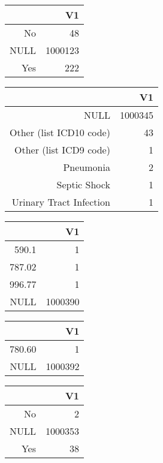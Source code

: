 \bigskip\bigskip
\centering
\begin{tabular}{rr}
  \hline
 & V1 \\ 
  \hline
No &  48 \\ 
  NULL & 1000123 \\ 
  Yes & 222 \\ 
   \hline
\end{tabular}

\bigskip\bigskip
\centering
\begin{tabular}{rr}
  \hline
 & V1 \\ 
  \hline
NULL & 1000345 \\ 
  Other (list ICD10 code) &  43 \\ 
  Other (list ICD9 code) &   1 \\ 
  Pneumonia &   2 \\ 
  Septic Shock &   1 \\ 
  Urinary Tract Infection &   1 \\ 
   \hline
\end{tabular}

\bigskip\bigskip
\centering
\begin{tabular}{rr}
  \hline
 & V1 \\ 
  \hline
590.1 &   1 \\ 
  787.02 &   1 \\ 
  996.77 &   1 \\ 
  NULL & 1000390 \\ 
   \hline
\end{tabular}

\bigskip\bigskip
\centering
\begin{tabular}{rr}
  \hline
 & V1 \\ 
  \hline
780.60 &   1 \\ 
  NULL & 1000392 \\ 
   \hline
\end{tabular}

\bigskip\bigskip
\centering
\begin{tabular}{rr}
  \hline
 & V1 \\ 
  \hline
No &   2 \\ 
  NULL & 1000353 \\ 
  Yes &  38 \\ 
   \hline
\end{tabular}

